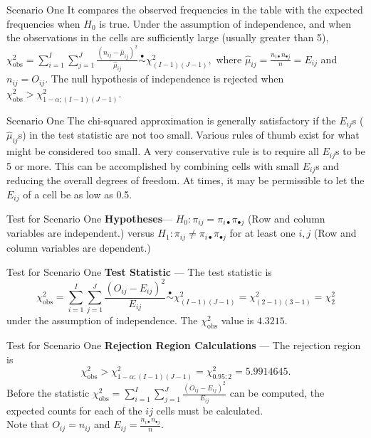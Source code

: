 \documentclass[
  ignorenonframetext,
]{beamer}
\begin{document}
\begin{frame}{Scenario One}
\protect\hypertarget{scenario-one-5}{}
It compares the observed frequencies in the table with the expected
frequencies when \(H_0\) is true. Under the assumption of independence,
and when the observations in the cells are sufficiently large (usually
greater than 5),
\(\chi_{\text{obs}}^2 =\sum_{i=1}^{I}\sum_{j=1}^J \frac{(n_{ij}-\hat{\mu}_{ij})^2}{\hat{\mu}_{ij}} \overset{\bullet}{\sim} \chi^2_{(I-1)(J-1)},\)
where \(\hat{\mu}_{ij}=\frac{n_{i\bullet}n_{\bullet j}}{n} = E_{ij}\)
and \(n_{ij} = O_{ij}\). The null hypothesis of independence is rejected
when \(\chi_{\text{obs}}^2 > \chi^2_{1-\alpha; (I-1)(J-1)}\).
\end{frame}

\begin{frame}{Scenario One}
\protect\hypertarget{scenario-one-6}{}
The chi-squared approximation is generally satisfactory if the
\(E_{ij}\)s (\(\hat{\mu}_{ij}\)s) in the test statistic are not too
small. Various rules of thumb exist for what might be considered too
small. A very conservative rule is to require all \(E_{ij}\)s to be 5 or
more. This can be accomplished by combining cells with small \(E_{ij}\)s
and reducing the overall degrees of freedom. At times, it may be
permissible to let the \(E_{ij}\) of a cell be as low as 0.5.
\end{frame}

\begin{frame}{Test for Scenario One}
\protect\hypertarget{test-for-scenario-one}{}
\textbf{Hypotheses}--- \(H_0: \pi_{ij} = \pi_{i\bullet}\pi_{\bullet j}\)
(Row and column variables are independent.) versus
\(H_1: \pi_{ij} \ne \pi_{i\bullet}\pi_{\bullet j}\) for at least one
\(i, j\) (Row and column variables are dependent.)
\end{frame}

\begin{frame}{Test for Scenario One}
\protect\hypertarget{test-for-scenario-one-1}{}
\textbf{Test Statistic} --- The test statistic is
\[\chi_{\text{obs}}^2=\sum_{i=1}^I \sum_{j=1}^J \frac{(O_{ij}-E_{ij})^2}{E_{ij}} \overset{\bullet}{\sim} \chi^2_{(I-1)(J-1)}=\chi^2_{(2-1)(3-1)}=\chi^2_2\]
under the assumption of independence. The \(\chi^2_{\text{obs}}\) value
is \(4.3215\).
\end{frame}

\begin{frame}{Test for Scenario One}
\protect\hypertarget{test-for-scenario-one-2}{}
\textbf{Rejection Region Calculations} --- The rejection region is
\[\chi_{\text{obs}}^2 > \chi^2_{1-\alpha; (I-1)(J-1)}=\chi^2_{0.95;2}=
        5.9914645.\] Before the statistic
\(\chi^2_{\text{obs}}= \sum_{i=1}^I\sum_{j=1}^J  \frac{(O_{ij} - E_{ij})^2}{E_{ij}}\)
can be computed, the expected counts for each of the \(ij\) cells must
be calculated.\\
Note that \(O_{ij}=n_{ij}\) and
\(E_{ij}=\frac{n_{i\bullet}n_{\bullet j}}{n}\).
\end{frame}
\end{document}
